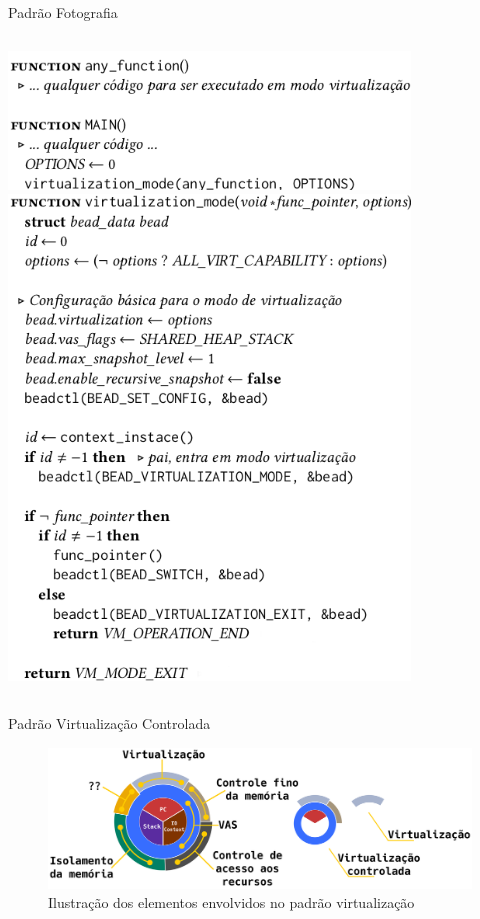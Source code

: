 \documentclass[xcolor={usenames,svgnames,dvipsnames},brazil,english,12pt,aspectratio=149]{beamer}
\newcommand\col{\column{.5\textwidth}}
\begin{document}
\begin{frame}{Padrão Fotografia}
  \begin{columns}[t]
    \col
      \centering
      \includegraphics[width=0.8\textwidth]{virtOne}
    \col
      \centering
      \includegraphics[width=0.8\textwidth]{virtTwo}
  \end{columns}
\end{frame}

\begin{frame}{Padrão Virtualização Controlada}
  \begin{figure}[!h]
    \centering
    \includegraphics[width=.8\textwidth]{decomposicao_virt_controlada}
    \caption*{Ilustração dos elementos envolvidos no padrão virtualização}
  \end{figure}
\end{frame}
\end{document}

